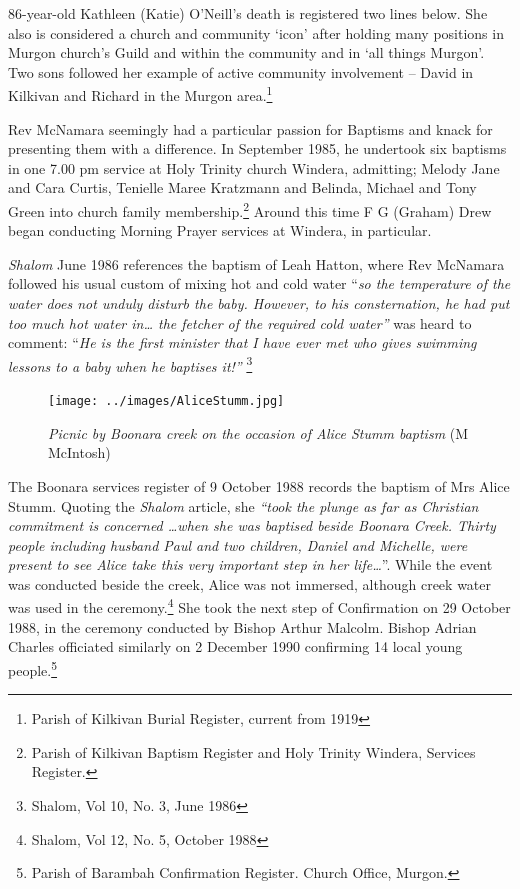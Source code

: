 86-year-old Kathleen (Katie) O'Neill's death is registered two lines below. She also is considered a church and community `icon' after holding many positions in Murgon church's Guild and within the community and in `all things Murgon'. Two sons followed her example of active community involvement -- David in Kilkivan and Richard in the Murgon area.\footnote{Parish of Kilkivan Burial Register, current from 1919}


Rev McNamara seemingly had a particular passion for Baptisms and knack for presenting them with a difference. In September 1985, he undertook six baptisms in one 7.00 pm service at Holy Trinity church Windera, admitting; Melody Jane and Cara Curtis, Tenielle Maree Kratzmann and Belinda, Michael and Tony Green into church family membership.\footnote{Parish of Kilkivan Baptism Register and Holy Trinity Windera, Services Register.} Around this time F G (Graham) Drew began conducting Morning Prayer services at Windera, in particular.


\emph{Shalom} June 1986 references the baptism of Leah Hatton, where Rev McNamara followed his usual custom of mixing hot and cold water ``\emph{so the temperature of the water does not unduly disturb the baby. However, to his consternation, he had put too much hot water in\ldots{} the fetcher of the required cold water''} was heard to comment: ``\emph{He is the first minister that I have ever met who gives swimming lessons to a baby when he baptises it!''} \footnote{Shalom, Vol 10, No. 3, June 1986}








\begin{figure}
\begin{center}
\texttt{[image: ../images/AliceStumm.jpg]}
\caption{{\itshape Picnic by Boonara creek on the occasion of Alice Stumm baptism} {\scriptsize(M McIntosh)}}
\end{center}
\end{figure}




The Boonara services register of 9 October 1988 records the baptism of Mrs Alice Stumm. Quoting the \emph{Shalom} article, she \emph{``took the plunge as far as Christian commitment is concerned \ldots when she was baptised beside Boonara Creek. Thirty people including husband Paul and two children, Daniel and Michelle, were present to see Alice take this very important step in her life\ldots{}}''. While the event was conducted beside the creek, Alice was not immersed, although creek water was used in the ceremony.\footnote{Shalom, Vol 12, No. 5, October 1988} She took the next step of Confirmation on 29 October 1988, in the ceremony conducted by Bishop Arthur Malcolm. Bishop Adrian Charles officiated similarly on 2 December 1990 confirming 14 local young people.\footnote{Parish of Barambah Confirmation Register. Church Office, Murgon.}



